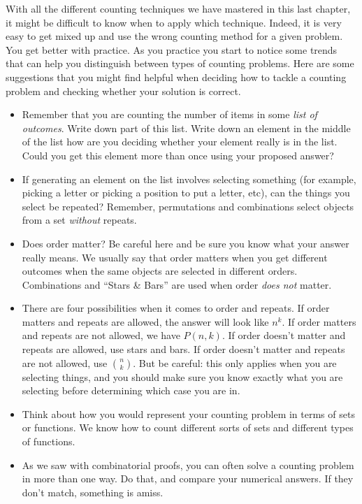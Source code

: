 \documentclass[10pt,]{book}
\theoremstyle{plain}
\theoremstyle{definition}
\theoremstyle{definition}
\theoremstyle{definition}
\numberwithin{equation}{chapter}
\begin{document}
      With all the different counting techniques we have mastered in this last chapter, it might be difficult to know when to apply which technique. Indeed, it is very easy to get mixed up and use the wrong counting method for a given problem. You get better with practice. As you practice you start to notice some trends that can help you distinguish between types of counting problems. Here are some suggestions that you might find helpful when deciding how to tackle a counting problem and checking whether your solution is correct.
\leavevmode%
\begin{itemize}[label=\textbullet]
\item{}
          Remember that you are counting the number of items in some \emph{list of outcomes}. Write down part of this list. Write down an element in the middle of the list \textendash{} how are you deciding whether your element really is in the list. Could you get this element more than once using your proposed answer?
\item{}
          If generating an element on the list involves selecting something (for example, picking a letter or picking a position to put a letter, etc), can the things you select be repeated? Remember, permutations and combinations select objects from a set \emph{without} repeats.
\item{}
          Does order matter? Be careful here and be sure you know what your answer really means. We usually say that order matters when you get different outcomes when the same objects are selected in different orders. Combinations and ``Stars \& Bars'' are used when order \emph{does not} matter.
\item{}
          There are four possibilities when it comes to order and repeats. If order matters and repeats are allowed, the answer will look like \(n^k\). If order matters and repeats are not allowed, we have \(P(n,k)\). If order doesn't matter and repeats are allowed, use stars and bars. If order doesn't matter and repeats are not allowed, use \({n\choose k}\). But be careful: this only applies when you are selecting things, and you should make sure you know exactly what you are selecting before determining which case you are in.
\item{}
          Think about how you would represent your counting problem in terms of sets or functions. We know how to count different sorts of sets and different types of functions.
\item{}
          As we saw with combinatorial proofs, you can often solve a counting problem in more than one way. Do that, and compare your numerical answers. If they don't match, something is amiss.
\end{itemize}
\par
\end{document}
